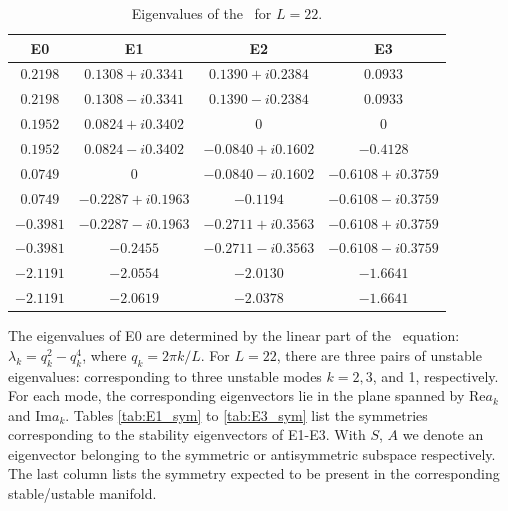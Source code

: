 \begin{table}
\caption{\label{tab:Ek_eigs} Eigenvalues of the \eqva\ for $L=22$.}
{\small
\begin{tabular}{cccc} \hline
  E0       &        E1         &         E2        &     E3   \\\hline
  $0.2198$ &  $0.1308+i0.3341$ &  $0.1390+i0.2384$ &  $0.0933$\\
  $0.2198$ &  $0.1308-i0.3341$ &  $0.1390-i0.2384$ &  $0.0933$\\
  $0.1952$ &  $0.0824+i0.3402$ &  $0$              &  $0$\\
  $0.1952$ &  $0.0824-i0.3402$ & $-0.0840+i0.1602$ & $-0.4128$\\
  $0.0749$ &  $0$              & $-0.0840-i0.1602$ & $-0.6108+i0.3759$\\
  $0.0749$ & $-0.2287+i0.1963$ & $-0.1194$         & $-0.6108-i0.3759$\\
 $-0.3981$ & $-0.2287-i0.1963$ & $-0.2711+i0.3563$ & $-0.6108+i0.3759$\\
 $-0.3981$ & $-0.2455$         & $-0.2711-i0.3563$ & $-0.6108-i0.3759$\\
 $-2.1191$ & $-2.0554$         & $-2.0130$         & $-1.6641$\\
 $-2.1191$ & $-2.0619$         & $-2.0378$         & $-1.6641$\\\hline
\end{tabular}}
\end{table}

The eigenvalues of E0 are determined by the linear part of the \KS\
equation: $\lambda_k=q_k^2-q_k^4$, where $q_k = 2\pi k/L$.  For
$L=22$, there are three pairs of unstable eigenvalues: corresponding
to three unstable modes $k=2,3$, and 1, respectively.  For each
mode, the corresponding eigenvectors lie in the plane spanned by
$\mathrm{Re} a_k$ and $\mathrm{Im} a_k$. Tables \ref{tab:E1_sym} to \ref{tab:E3_sym}
list the symmetries corresponding to the stability eigenvectors of \eqva E1-E3.
With $S$, $A$ we denote an eigenvector belonging to the symmetric
or antisymmetric subspace respectively. The last column lists
the symmetry expected to be present in the corresponding
stable/ustable manifold.

